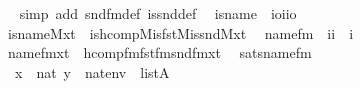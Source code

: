 \begin{isabellebody}
%
\isadelimproof
\ \ %
\endisadelimproof
%
\isatagproof
{}\isamarkupfalse%
\ {\isacharparenleft}{\kern0pt}simp\ add{\isacharcolon}{\kern0pt}\ snd{\isacharunderscore}{\kern0pt}fm{\isacharunderscore}{\kern0pt}def\ is{\isacharunderscore}{\kern0pt}snd{\isacharunderscore}{\kern0pt}def{\isacharparenright}{\kern0pt}%
\endisatagproof
{\isafoldproof}%
%
\isadelimproof
\isanewline
%
\endisadelimproof
\isanewline
{}\isamarkupfalse%
\isanewline
\ \ is{\isacharunderscore}{\kern0pt}name{}\ {\isacharcolon}{\kern0pt}{\isacharcolon}{\kern0pt}\ {\isachardoublequoteopen}{\isacharparenleft}{\kern0pt}i{\isasymRightarrow}o{\isacharparenright}{\kern0pt}{\isasymRightarrow}i{\isasymRightarrow}i{\isasymRightarrow}o{\isachardoublequoteclose}\ \isanewline
\ \ {\isachardoublequoteopen}is{\isacharunderscore}{\kern0pt}name{}{\isacharparenleft}{\kern0pt}M{\isacharcomma}{\kern0pt}x{\isacharcomma}{\kern0pt}t{}{\isacharparenright}{\kern0pt}\ {\isasymequiv}\ is{\isacharunderscore}{\kern0pt}hcomp{\isacharparenleft}{\kern0pt}M{\isacharcomma}{\kern0pt}is{\isacharunderscore}{\kern0pt}fst{\isacharparenleft}{\kern0pt}M{\isacharparenright}{\kern0pt}{\isacharcomma}{\kern0pt}is{\isacharunderscore}{\kern0pt}snd{\isacharparenleft}{\kern0pt}M{\isacharparenright}{\kern0pt}{\isacharcomma}{\kern0pt}x{\isacharcomma}{\kern0pt}t{}{\isacharparenright}{\kern0pt}{\isachardoublequoteclose}\isanewline
\isanewline
{}\isamarkupfalse%
\isanewline
\ \ name{}{\isacharunderscore}{\kern0pt}fm\ {\isacharcolon}{\kern0pt}{\isacharcolon}{\kern0pt}\ {\isachardoublequoteopen}{\isacharbrackleft}{\kern0pt}i{\isacharcomma}{\kern0pt}i{\isacharbrackright}{\kern0pt}\ {\isasymRightarrow}\ i{\isachardoublequoteclose}\ \isanewline
\ \ {\isachardoublequoteopen}name{}{\isacharunderscore}{\kern0pt}fm{\isacharparenleft}{\kern0pt}x{\isacharcomma}{\kern0pt}t{\isacharparenright}{\kern0pt}\ {\isasymequiv}\ hcomp{\isacharunderscore}{\kern0pt}fm{\isacharparenleft}{\kern0pt}fst{\isacharunderscore}{\kern0pt}fm{\isacharcomma}{\kern0pt}snd{\isacharunderscore}{\kern0pt}fm{\isacharcomma}{\kern0pt}x{\isacharcomma}{\kern0pt}t{\isacharparenright}{\kern0pt}{\isachardoublequoteclose}\ \isanewline
\isanewline
{}\isamarkupfalse%
\ sats{\isacharunderscore}{\kern0pt}name{}{\isacharunderscore}{\kern0pt}fm\ {\isacharcolon}{\kern0pt}\isanewline
\ \ {\isachardoublequoteopen}{\isasymlbrakk}\ x\ {\isasymin}\ nat{\isacharsemicolon}{\kern0pt}\ y\ {\isasymin}\ nat{\isacharsemicolon}{\kern0pt}env\ {\isasymin}\ list{\isacharparenleft}{\kern0pt}A{\isacharparenright}{\kern0pt}\ {\isasymrbrakk}\ \isanewline

\end{isabellebody}
